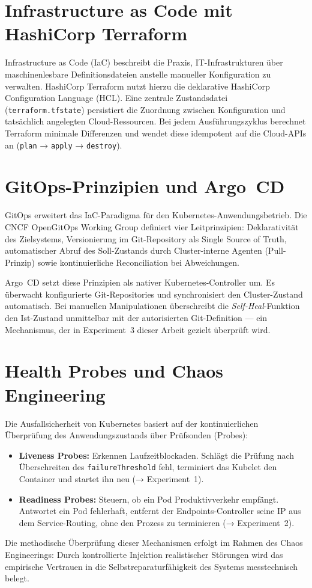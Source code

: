 \section{Infrastructure as Code mit HashiCorp Terraform}
\label{sec:terraform-grundlagen}
Infrastructure as Code (IaC) beschreibt die Praxis, IT-Infrastrukturen über maschinenlesbare Definitionsdateien anstelle manueller Konfiguration zu verwalten. HashiCorp Terraform nutzt hierzu die deklarative HashiCorp Configuration Language (HCL). Eine zentrale Zustandsdatei (\texttt{terraform.tfstate}) persistiert die Zuordnung zwischen Konfiguration und tatsächlich angelegten Cloud-Ressourcen. Bei jedem Ausführungszyklus berechnet Terraform minimale Differenzen und wendet diese idempotent auf die Cloud-APIs an (\texttt{plan} → \texttt{apply} → \texttt{destroy}).

\section{GitOps-Prinzipien und Argo~CD}
\label{sec:gitops-argocd}
GitOps erweitert das IaC-Paradigma für den Kubernetes-Anwendungsbetrieb. Die CNCF OpenGitOps Working Group definiert vier Leitprinzipien: Deklarativität des Zielsystems, Versionierung im Git-Repository als Single Source of Truth, automatischer Abruf des Soll-Zustands durch Cluster-interne Agenten (Pull-Prinzip) sowie kontinuierliche Reconciliation bei Abweichungen.

Argo~CD setzt diese Prinzipien als nativer Kubernetes-Controller um. Es überwacht konfigurierte Git-Repositories und synchronisiert den Cluster-Zustand automatisch. Bei manuellen Manipulationen überschreibt die \textit{Self-Heal}-Funktion den Ist-Zustand unmittelbar mit der autorisierten Git-Definition — ein Mechanismus, der in Experiment~3 dieser Arbeit gezielt überprüft wird.

\section{Health Probes und Chaos Engineering}
\label{sec:k8s-fehlertoleranz}
Die Ausfallsicherheit von Kubernetes basiert auf der kontinuierlichen Überprüfung des Anwendungszustands über Prüfsonden (Probes):
\begin{itemize}[noitemsep,topsep=2pt]
    \item \textbf{Liveness Probes:} Erkennen Laufzeitblockaden. Schlägt die Prüfung nach Überschreiten des \texttt{failureThreshold} fehl, terminiert das Kubelet den Container und startet ihn neu (→ Experiment~1).
    \item \textbf{Readiness Probes:} Steuern, ob ein Pod Produktivverkehr empfängt. Antwortet ein Pod fehlerhaft, entfernt der Endpoints-Controller seine IP aus dem Service-Routing, ohne den Prozess zu terminieren (→ Experiment~2).
\end{itemize}

Die methodische Überprüfung dieser Mechanismen erfolgt im Rahmen des Chaos Engineerings: Durch kontrollierte Injektion realistischer Störungen wird das empirische Vertrauen in die Selbstreparaturfähigkeit des Systems messtechnisch belegt.
